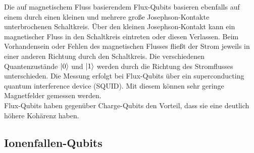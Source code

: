 Die auf magnetischem Fluss basierendem Flux-Qubits basieren ebenfalls auf einem durch einen kleinen und mehrere große Josephson-Kontakte unterbrochenen Schaltkreis.
Über den kleinen Josephson-Kontakt kann ein magnetischer Fluss in den Schaltkreis eintreten oder diesen Verlassen. Beim Vorhandensein oder Fehlen des magnetischen Flusses fließt der Strom jeweils in einer anderen Richtung durch den Schaltkreis. Die verschiedenen Quantenzustände $\ket0$ und $\ket1$ werden durch die Richtung des Stromflusses unterschieden. Die Messung erfolgt bei Flux-Qubits über ein superconducting quantum interference device (SQUID). Mit diesem können sehr geringe Magnetfelder gemessen werden.\\
Flux-Qubits haben gegenüber Charge-Qubits den Vorteil, dass sie eine deutlich höhere Kohärenz haben.


\subsection{Ionenfallen-Qubits }

